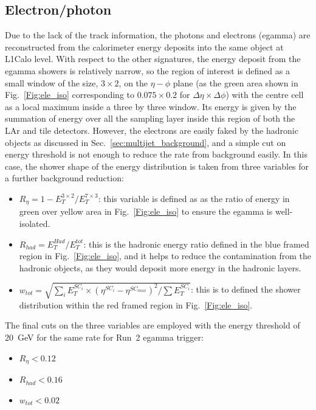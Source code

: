 \subsection{Electron/photon}
Due to the lack of the track information, the photons and electrons (egamma) are reconstructed from the calorimeter energy deposits into the same object at L1Calo level. With respect to the other signatures, the energy deposit from the egamma  showers is relatively narrow, so the region of interest is defined as a small window of the size, $3\times2$, on the $\eta-\phi$ plane (as the green area shown in Fig.~\ref{Fig:ele_iso} corresponding to $0.075\times0.2$ for $\Delta\eta\times\Delta\phi$) with the centre cell as a local maximum inside a three by three window. Its energy is given by the summation of energy over all the sampling layer inside this region of both the LAr and tile detectors. However, the electrons are easily faked by the hadronic objects as discussed in Sec.~\ref{sec:multijet_background}, and a simple cut on energy threshold is not enough to reduce the rate from background easily. In this case, the shower shape of the energy distribution is taken from three variables for a further background reduction:
\begin{itemize}
	\item $R_\eta=1-E_{T}^{3\times2}/E_{T}^{7\times3}$: this variable is defined as as the ratio of energy in green over yellow area in Fig.~\ref{Fig:ele_iso} to ensure the egamma is well-isolated. 
	\item $R_{had} = E^{Had}_{T}/E^{tot}_{T}$: this is the hadronic energy ratio defined in the blue framed region in Fig.~\ref{Fig:ele_iso}, and it helps to reduce the contamination from the hadronic objects, as they would deposit more energy in the hadronic layers.
	\item $w_{tot}=\sqrt{\sum_i E^{SC_i}_{T}\times(\eta^{SC_i}-\eta^{SC_{max}})^2/\sum E^{SC_i}_{T}}$: this is to defined the shower distribution within the red framed region in Fig.~\ref{Fig:ele_iso}. 
\end{itemize}
The final cuts on the three variables are employed with the energy threshold of 20~GeV for the same rate for Run~2 egamma trigger:
\begin{itemize}
	\item $R_\eta<0.12$
	\item $R_{had}<0.16$
	\item $w_{tot}<0.02$
\end{itemize}

